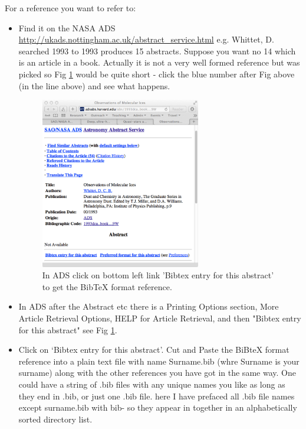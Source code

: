 \documentclass[twoside,fontsize=12pt,
     bibliography=totoc, %
     listof=totoc, %
     index=totoc, %
     onehalfspacing %
]{_MScDiss2017_cls}
\begin{document}
For a reference you want to refer to:
\begin{itemize}
\item Find it on the NASA ADS  \url{http://ukads.nottingham.ac.uk/abstract_service.html} 
e.g. Whittet, D.  searched 1993 to 1993 produces 15 abstracts. Suppose you want no 14  which is an article in a book.
Actually it is not a very well formed reference but was picked so Fig \ref{fig_bibads} would be quite short - click the blue number after Fig above (in the line above) and see what happens.
\begin{figure}[hbtp]
  \centering
  \includegraphics[width=70mm]{fig-bib}  %
  \caption[Get BibTeX format reference from ADS.]%
  {In ADS click on bottom left link 'Bibtex entry for this abstract' to get the BibTeX format reference.}%
  \label{fig_bibads}
\end{figure}
\item In ADS after the Abstract etc there is a Printing Options section, More Article Retrieval Options, HELP for Article Retrieval, and then "Bibtex entry for this abstract" see Fig \ref{fig_bibads}. 
\item Click on \lq Bibtex entry for this abstract\rq. Cut and Paste the BiBteX format reference into a plain text file with name Surname.bib (whre Surname is your surname) along with the other references you have got in the same way.  One could have a string of .bib files with any unique names you like as long as they end in .bib, or just one .bib file. here I have prefaced all .bib file names except surname.bib with bib- so they appear in together in an alphabetically sorted directory list.
\end{itemize}
\end{document}

